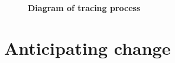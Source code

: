 








\begin{figure}
\centering
\resizebox{1.0\textwidth}{!}{}
\caption[Diagram of tracing process]{\textbf{Diagram of tracing process}}\label{fig:proc-tracing}
\end{figure}



\section{Anticipating change}

